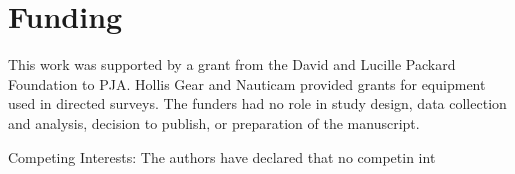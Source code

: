 \section{Funding}
\label{funding} 
This work was supported by a grant from the David and Lucille Packard Foundation to PJA. Hollis Gear and Nauticam provided grants for equipment used in directed surveys. The funders had no role in study design, data collection and analysis, 
decision to publish, or preparation of the manuscript.

Competing Interests: The authors have declared that no competin int

